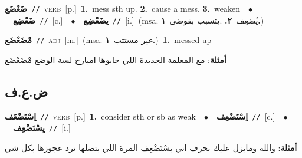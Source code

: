 \documentclass[10pt,a4paper,twoside]{article} %
\begin{document}
\begin{multicols}{2}
{\setlength\topsep{0pt}\textbf{\foreignlanguage{arabic}{ضَعْضَع}}\ {\color{gray}\texttt{//}\color{black}}\ \textsc{verb}\ [p.]\ \textbf{1.}~mess sth up.  \textbf{2.}~cause a mess.  \textbf{3.}~weaken\ \ $\bullet$\ \ \setlength\topsep{0pt}\textbf{\foreignlanguage{arabic}{ضَعْضِع}}\ {\color{gray}\texttt{//}\color{black}}\ [c.]\ \ $\bullet$\ \ \setlength\topsep{0pt}\textbf{\foreignlanguage{arabic}{يضَعْضِع}}\ {\color{gray}\texttt{//}\color{black}}\ [i.]\ \color{gray}(msa. \foreignlanguage{arabic}{يُضعِف}~\foreignlanguage{arabic}{\textbf{٢.}}  .\foreignlanguage{arabic}{يتسبب بفوضى}~\foreignlanguage{arabic}{\textbf{١.}})\color{black}\ } \vspace{2mm}

{\setlength\topsep{0pt}\textbf{\foreignlanguage{arabic}{مْضَعْضَع}}\ {\color{gray}\texttt{//}\color{black}}\ \textsc{adj}\ [m.]\ \color{gray}(msa. \foreignlanguage{arabic}{غير مستتب}~\foreignlanguage{arabic}{\textbf{١.}})\color{black}\ \textbf{1.}~messed up\  \begin{flushright}\color{gray}\foreignlanguage{arabic}{\textbf{\underline{\foreignlanguage{arabic}{أمثلة}}}: مع المعلمة الجديدة اللي جابوها امبارح لسة الوضع مْضَعْضَع}\end{flushright}\color{black}} \vspace{2mm}

\vspace{-3mm}
\subsection*{\color{blue}\foreignlanguage{arabic}{ض.ع.ف}\color{blue}{}} 

{\setlength\topsep{0pt}\textbf{\foreignlanguage{arabic}{اِسْتَضْعَف}}\ {\color{gray}\texttt{//}\color{black}}\ \textsc{verb}\ [p.]\ \textbf{1.}~consider sth or sb as weak\ \ $\bullet$\ \ \setlength\topsep{0pt}\textbf{\foreignlanguage{arabic}{اِسْتَضْعِف}}\ {\color{gray}\texttt{//}\color{black}}\ [c.]\ \ $\bullet$\ \ \setlength\topsep{0pt}\textbf{\foreignlanguage{arabic}{يِسْتَضْعِف}}\ {\color{gray}\texttt{//}\color{black}}\ [i.]\  \begin{flushright}\color{gray}\foreignlanguage{arabic}{\textbf{\underline{\foreignlanguage{arabic}{أمثلة}}}: والله ومابزل عليك بحرف اني بسْتَضْعِف المرة اللي بتضلها ترد عجوزها بكل شي}\end{flushright}\color{black}} \vspace{2mm}


\end{multicols}
\end{document}
